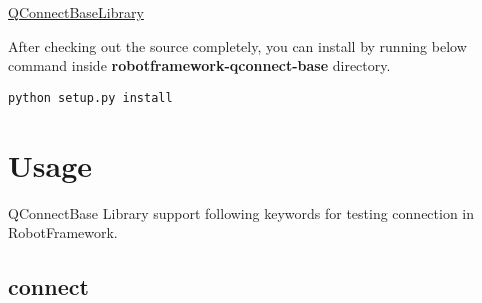\href{https://github.com/test-fullautomation/robotframework-qconnect-base}{QConnectBaseLibrary}

After checking out the source completely, you can install by running
below command inside \textbf{robotframework-qconnect-base} directory.

\begin{verbatim}
python setup.py install
\end{verbatim}

\hypertarget{description-usage}{%
\section{Usage}\label{description-usage}}

QConnectBase Library support following keywords for testing connection
in RobotFramework.

\hypertarget{description-connect}{%
\subsection{\texorpdfstring{\textbf{connect}}{connect}}\label{description-connect}}

